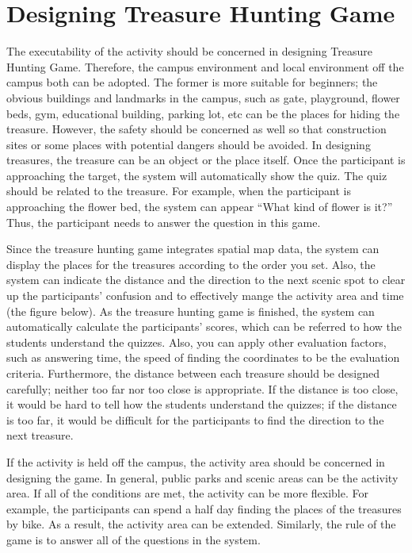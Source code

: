 \documentclass[11.4pt,a4paper,times]{report}
\begin{document}
	

	
	

	\section{Designing Treasure Hunting Game}
	
	The executability of the activity should be concerned in designing Treasure Hunting Game. Therefore, the campus environment and local environment off the campus both can be adopted. The former is more suitable for beginners; the obvious buildings and landmarks in the campus, such as gate, playground, flower beds, gym, educational building, parking lot, etc can be the places for hiding the treasure. However, the safety should be concerned as well so that construction sites or some places with potential dangers should be avoided. In designing treasures, the treasure can be an object or the place itself. Once the participant is approaching the target, the system will automatically show the quiz. The quiz should be related to the treasure. For example, when the participant is approaching the flower bed, the system can appear “What kind of flower is it?” Thus, the participant needs to answer the question in this game. 
	
	Since the treasure hunting game integrates spatial map data, the system can display the places for the treasures according to the order you set. Also, the system can indicate the distance and the direction to the next scenic spot to clear up the participants’ confusion and to effectively mange the activity area and time (the figure below). As the treasure hunting game is finished, the system can automatically calculate the participants’ scores, which can be referred to how the students understand the quizzes. Also, you can apply other evaluation factors, such as answering time, the speed of finding the coordinates to be the evaluation criteria. Furthermore, the distance between each treasure should be designed carefully; neither too far nor too close is appropriate. If the distance is too close, it would be hard to tell how the students understand the quizzes; if the distance is too far, it would be difficult for the participants to find the direction to the next treasure.
	
	If the activity is held off the campus, the activity area should be concerned in designing the game. In general, public parks and scenic areas can be the activity area. If all of the conditions are met, the activity can be more flexible. For example, the participants can spend a half day finding the places of the treasures by bike. As a result, the activity area can be extended. Similarly, the rule of the game is to answer all of the questions in the system.
	
\end{document}
